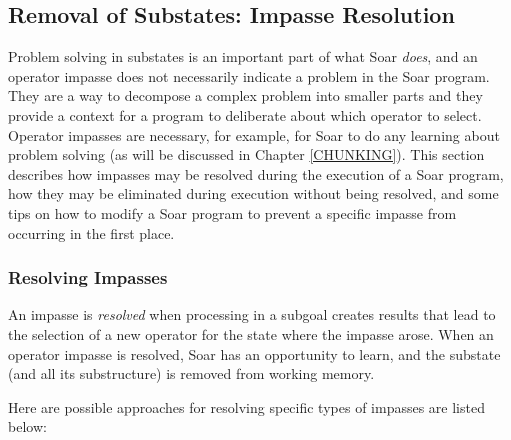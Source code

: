 \subsection{Removal of Substates: Impasse Resolution}
\label{ARCH-impasses-elimination}

Problem solving in substates is an important part of what Soar \textit{does}, and an operator impasse does not necessarily indicate a problem in the Soar program.  They are a way to decompose a complex problem into smaller parts and they provide a context for a program to deliberate about which operator to select.  Operator impasses are necessary, for example, for Soar to do any learning about problem solving (as will be discussed in Chapter \ref{CHUNKING}). This section describes how impasses may be resolved during the execution of a Soar program, how they may be eliminated during execution without being resolved, and some tips on how to modify a Soar program to prevent a specific impasse from occurring in the first place.

\subsubsection*{Resolving Impasses}

An impasse is \textit{resolved} when processing in a subgoal creates results that lead to the selection of a new operator for the state where the impasse arose. When an operator impasse is resolved, Soar has an opportunity to learn, and the substate (and all its substructure) is removed from working memory.

Here are possible approaches for resolving specific types of impasses are listed below:

